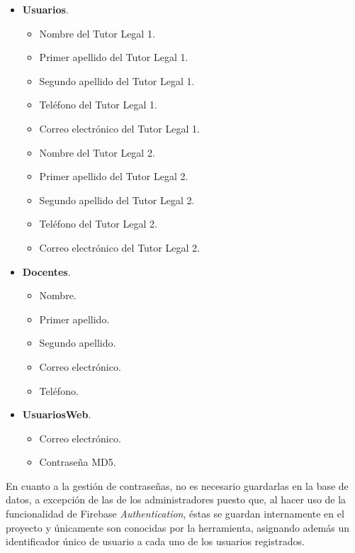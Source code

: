 \begin{itemize}
	\item \textbf{Usuarios}.
		\begin{itemize}
			\item Nombre del Tutor Legal 1.
			\item Primer apellido del Tutor Legal 1.
			\item Segundo apellido del Tutor Legal 1.
			\item Teléfono del Tutor Legal 1.
			\item Correo electrónico del Tutor Legal 1.
			\item Nombre del Tutor Legal 2.
			\item Primer apellido del Tutor Legal 2.
			\item Segundo apellido del Tutor Legal 2.
			\item Teléfono del Tutor Legal 2.
			\item Correo electrónico del Tutor Legal 2.
		\end{itemize}
		
	\item \textbf{Docentes}.
		\begin{itemize}
			\item Nombre.
			\item Primer apellido.
			\item Segundo apellido.
			\item Correo electrónico.
			\item Teléfono.
		\end{itemize}
		
	\item \textbf{UsuariosWeb}.
		\begin{itemize}
			\item Correo electrónico.
			\item Contraseña MD5.
		\end{itemize}
		
\end{itemize}

En cuanto a la gestión de contraseñas, no es necesario guardarlas en la base de datos, a excepción de las de los administradores puesto que, al hacer uso de la funcionalidad de Firebase \textit{Authentication}, éstas se guardan internamente en el proyecto y únicamente son conocidas por la herramienta, asignando además un identificador único de usuario a cada uno de los usuarios registrados.

